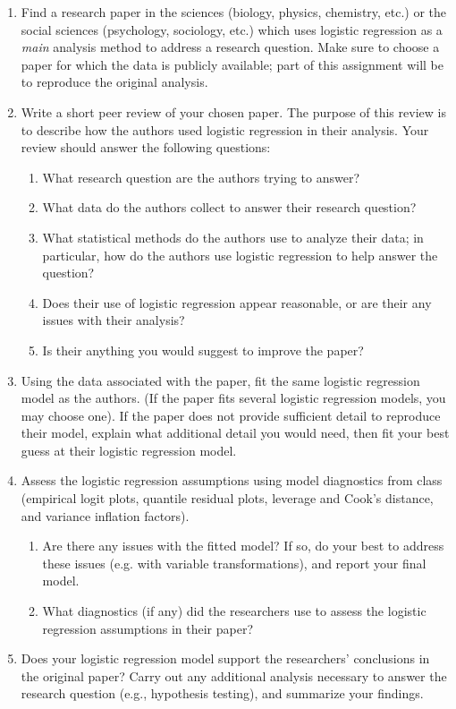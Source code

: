 \documentclass[11pt]{article}
\begin{document}
\begin{enumerate}
\item Find a research paper in the sciences (biology, physics, chemistry, etc.) or the social sciences (psychology, sociology, etc.) which uses logistic regression as a \textit{main} analysis method to address a research question. Make sure to choose a paper for which the data is publicly available; part of this assignment will be to reproduce the original analysis.

\item Write a short peer review of your chosen paper. The purpose of this review is to describe how the authors used logistic regression in their analysis. Your review should answer the following questions:
\begin{enumerate}
\item What research question are the authors trying to answer?
\item What data do the authors collect to answer their research question?
\item What statistical methods do the authors use to analyze their data; in particular, how do the authors use logistic regression to help answer the question?
\item Does their use of logistic regression appear reasonable, or are their any issues with their analysis?
\item Is their anything you would suggest to improve the paper?
\end{enumerate}

\item Using the data associated with the paper, fit the same logistic regression model as the authors. (If the paper fits several logistic regression models, you may choose one). If the paper does not provide sufficient detail to reproduce their model, explain what additional detail you would need, then fit your best guess at their logistic regression model.

\item Assess the logistic regression assumptions using model diagnostics from class (empirical logit plots, quantile residual plots, leverage and Cook's distance, and variance inflation factors).

\begin{enumerate}
\item Are there any issues with the fitted model? If so, do your best to address these issues (e.g. with variable transformations), and report your final model.

\item What diagnostics (if any) did the researchers use to assess the logistic regression assumptions in their paper?
\end{enumerate}

\item Does your logistic regression model support the researchers' conclusions in the original paper? Carry out any additional analysis necessary to answer the research question (e.g., hypothesis testing), and summarize your findings.

\end{enumerate}
\end{document}
